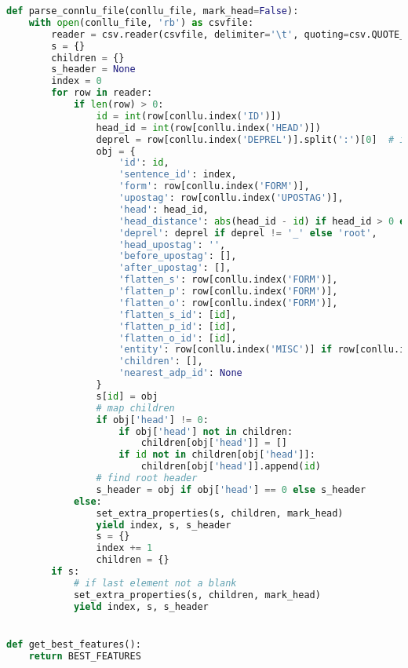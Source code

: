 \begin{lstlisting}[language=Python]
def parse_connlu_file(conllu_file, mark_head=False):
    with open(conllu_file, 'rb') as csvfile:
        reader = csv.reader(csvfile, delimiter='\t', quoting=csv.QUOTE_NONE)
        s = {}
        children = {}
        s_header = None
        index = 0
        for row in reader:
            if len(row) > 0:
                id = int(row[conllu.index('ID')])
                head_id = int(row[conllu.index('HEAD')])
                deprel = row[conllu.index('DEPREL')].split(':')[0]  # ignore sub relation
                obj = {
                    'id': id,
                    'sentence_id': index,
                    'form': row[conllu.index('FORM')],
                    'upostag': row[conllu.index('UPOSTAG')],
                    'head': head_id,
                    'head_distance': abs(head_id - id) if head_id > 0 else 0,
                    'deprel': deprel if deprel != '_' else 'root',
                    'head_upostag': '',
                    'before_upostag': [],
                    'after_upostag': [],
                    'flatten_s': row[conllu.index('FORM')],
                    'flatten_p': row[conllu.index('FORM')],
                    'flatten_o': row[conllu.index('FORM')],
                    'flatten_s_id': [id],
                    'flatten_p_id': [id],
                    'flatten_o_id': [id],
                    'entity': row[conllu.index('MISC')] if row[conllu.index('MISC')] != '_' else '',
                    'children': [],
                    'nearest_adp_id': None
                }
                s[id] = obj
                # map children
                if obj['head'] != 0:
                    if obj['head'] not in children:
                        children[obj['head']] = []
                    if id not in children[obj['head']]:
                        children[obj['head']].append(id)
                # find root header
                s_header = obj if obj['head'] == 0 else s_header
            else:
                set_extra_properties(s, children, mark_head)
                yield index, s, s_header
                s = {}
                index += 1
                children = {}
        if s:
            # if last element not a blank
            set_extra_properties(s, children, mark_head)
            yield index, s, s_header


def get_best_features():
    return BEST_FEATURES
\end{lstlisting}



